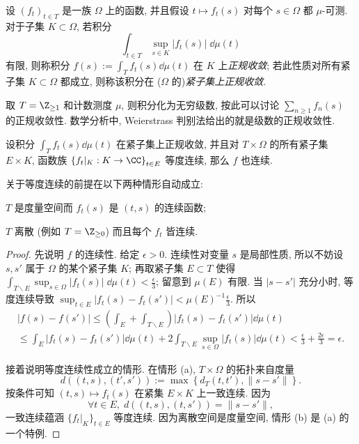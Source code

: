 \begin{definition}\label{def:normal-convergence} 
	设 $(f_t)_{t \in T}$ 是一族 $\Omega$ 上的函数, 并且假设 $t \mapsto f_t(s)$ 对每个 $s \in \Omega$ 都 $\mu$-可测. 对于子集 $K \subset \Omega$, 若积分
	\[ \int_{t \in T} \sup_{s \in K}|f_t(s)| \; \dd\mu(t) \]
	有限, 则称积分 $f(s) := \int_T f_t(s) \dd\mu(t)$ 在 $K$ 上\emph{正规收敛}; 若此性质对所有紧子集 $K \subset \Omega$ 都成立, 则称该积分在 ($\Omega$ 的)\emph{紧子集上正规收敛}.
\end{definition}

取 $T = \Z_{\geq 1}$ 和计数测度 $\mu$, 则积分化为无穷级数, 按此可以讨论 $\sum_{n \geq 1} f_n(s)$ 的正规收敛性. 数学分析中, Weierstrass 判别法给出的就是级数的正规收敛性.

\begin{lemma}\label{prop:equicontinuity}
	设积分 $\int_T f_t(s) \dd\mu(t)$ 在紧子集上正规收敛, 并且对 $T \times \Omega$ 的所有紧子集 $E \times K$, 函数族 $\left\{ f_t|_K: K \to \CC \right\}_{t \in E}$ 等度连续, 那么 $f$ 也连续.

	关于等度连续的前提在以下两种情形自动成立:
	\begin{compactenum}[(a)]
		\item $T$ 是度量空间而 $f_t(s)$ 是 $(t,s)$ 的连续函数;
		\item $T$ 离散 (例如 $T = \Z_{\geq 0}$) 而且每个 $f_t$ 皆连续.
	\end{compactenum}
\end{lemma}
\begin{proof}
	先说明 $f$ 的连续性. 给定 $\epsilon > 0$. 连续性对变量 $s$ 是局部性质, 所以不妨设 $s, s'$ 属于 $\Omega$ 的某个紧子集 $K$; 再取紧子集 $E \subset T$ 使得 $\int_{T \smallsetminus E} \sup_{s \in \Omega} |f_t(s)| \; \dd\mu(t) < \frac{\epsilon}{3}$; 留意到 $\mu(E)$ 有限. 当 $|s-s'|$ 充分小时, 等度连续导致 $\sup_{t \in E} |f_t(s) - f_t(s')| < \mu(E)^{-1} \frac{\epsilon}{3}$. 所以
	\begin{multline*}
		\left| f(s) - f(s') \right| \leq \left( \int_E + \int_{T \smallsetminus E} \right) |f_t(s) - f_t(s')| \dd\mu(t) \\
		\leq \int_E |f_t(s) - f_t(s')| \dd\mu(t) + 2 \int_{T \smallsetminus E} \sup_{s \in \Omega} |f_t(s)| \dd\mu(t) < \frac{\epsilon}{3} + \frac{2\epsilon}{3} = \epsilon.
	\end{multline*}
	
	接着说明等度连续性成立的情形. 在情形 (a), $T \times \Omega$ 的拓扑来自度量
	\[ d((t,s), (t',s')) := \max\left\{ d_T(t,t'), \|s - s'\| \right\}. \]
	按条件可知 $(t,s) \mapsto f_t(s)$ 在紧集 $E \times K$ 上一致连续. 因为
	\[ \forall t \in E, \; d((t, s), (t, s')) = \|s - s' \|, \]
	一致连续蕴涵 $\{f_t|_K \}_{t \in E}$ 等度连续. 因为离散空间是度量空间, 情形 (b) 是 (a) 的一个特例.
\end{proof}

